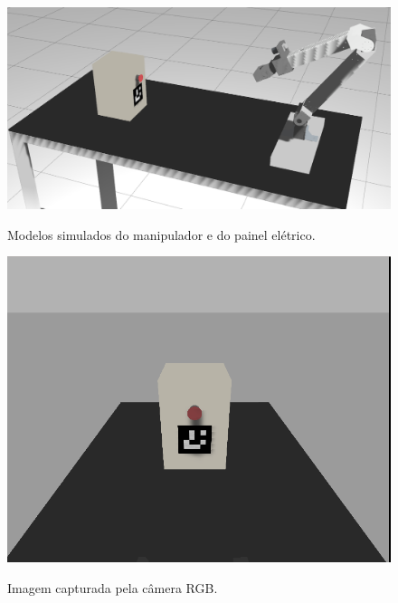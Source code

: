 \begin{figure}[H]
  \caption{Modelos simulados do manipulador e do painel elétrico.}
  \centering
  \includegraphics[scale=0.3]{images/timon.png}
  \label{fig:timon_gaz}
\end{figure}


\begin{figure}[H]
  \caption{Imagem capturada pela câmera RGB.}
  \centering
  \includegraphics[scale=0.3]{images/camera.png}
  \label{fig:camera_gaz}
\end{figure}






